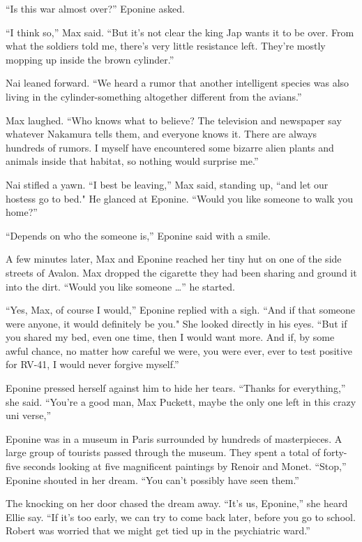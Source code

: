 \documentclass[]{article}
\begin{document}
{{“Is this war almost over?” Eponine asked.

“I think so,” Max said.  “But it’s not clear the king Jap wants it to be over.  From what the soldiers told me, there’s very little resistance left.  They’re mostly mopping up inside the brown cylinder.”

Nai leaned forward.  “We heard a rumor that another intelligent species was also living in the cylinder-something altogether different from the avians.”

Max laughed.  “Who knows what to believe? The television and newspaper say whatever Nakamura tells them, and everyone knows it.  There are always hundreds of rumors.  I myself have encountered some bizarre alien plants and animals inside that habitat, so nothing would surprise me.”

Nai stifled a yawn.  “I best be leaving,” Max said, standing up, “and let our hostess go to bed."  He glanced at Eponine.  “Would you like someone to walk you home?”

“Depends on who the someone is,” Eponine said with a smile.

A few minutes later, Max and Eponine reached her tiny hut on one of the side streets of Avalon.  Max dropped the cigarette they had been sharing and ground it into the dirt.  “Would you like someone …” he started.

“Yes, Max, of course I would,” Eponine replied with a sigh.  “And if that someone were anyone, it would definitely be you."  She looked directly in his eyes.  “But if you shared my bed, even one time, then I would want more.  And if, by some awful chance, no matter how careful we were, you were ever, ever to test positive for RV-41, I would never forgive myself.”

Eponine pressed herself against him to hide her tears.  “Thanks for everything,” she said.  “You’re a good man, Max Puckett, maybe the only one left in this crazy uni verse,”

Eponine was in a museum in Paris surrounded by hundreds of masterpieces.  A large group of tourists passed through the museum.  They spent a total of forty-five seconds looking at five magnificent paintings by Renoir and Monet.  “Stop,” Eponine shouted in her dream.  “You can’t possibly have seen them.”

The knocking on her door chased the dream away.  “It’s us, Eponine,” she heard Ellie say.  “If it’s too early, we can try to come back later, before you go to school.  Robert was worried that we might get tied up in the psychiatric ward.”

}}
\end{document}
